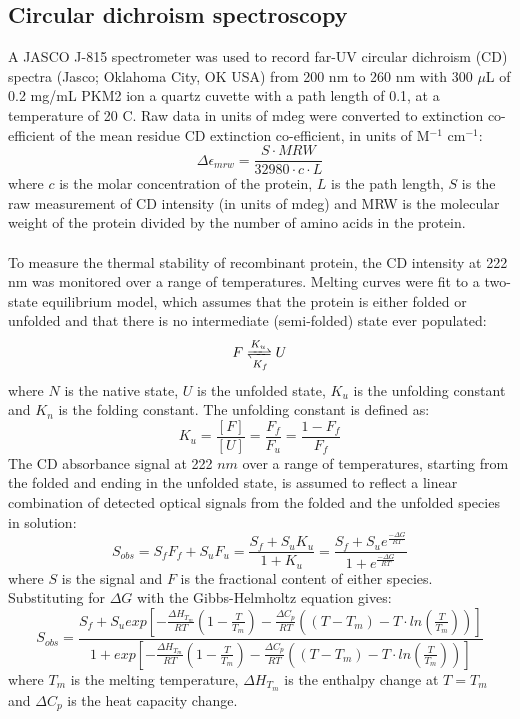 \subsection{Circular dichroism spectroscopy}
\label{methods:cd_spec}
A JASCO J-815 spectrometer was used to record far-UV circular dichroism (CD) spectra (Jasco; Oklahoma City, OK USA) from 200 nm to 260 nm with 300 $\mu$L of 0.2 mg/mL PKM2 ion a quartz cuvette with a path length of 0.1, at a temperature of 20 \textdegree C. Raw data in units of mdeg were converted to extinction co-efficient of the mean residue CD extinction co-efficient, in units of M$^{-1}$ cm$^{-1}$:
%
%
\begin{equation}
\Delta \epsilon_{mrw} = \frac{S \cdot MRW}{32980 \cdot c \cdot L}
\end{equation}
%
%
where $c$ is the molar concentration of the protein, $L$ is the path length, $S$ is the raw measurement of CD intensity (in units of mdeg) and MRW is the molecular weight of the protein divided by the number of amino acids in the protein.
%
%
\\\\
%
%
To measure the thermal stability of recombinant protein, the CD intensity at 222 nm was monitored over a range of temperatures. Melting curves were fit to a two-state equilibrium model, which assumes that the protein is either folded or unfolded and that there is no intermediate (semi-folded) state ever populated:
%
%
\begin{equation}
F \xrightleftharpoons[K_f]{K_u} U
\end{equation} 
%
%
where $N$ is the native state, $U$ is the unfolded state, $K_u$ is the unfolding constant and $K_n$ is the folding constant. The unfolding constant is defined as:
%
%
\begin{equation}
K_u = \frac{[F]}{[U]} = \frac{F_f}{F_u} =  \frac{1 - F_f}{F_f}
\end{equation}
%
%
The CD absorbance signal at 222 $nm$ over a range of temperatures, starting from the folded and ending in the unfolded state, is assumed to reflect a linear combination of detected optical signals from the folded and the unfolded species in solution:
%
%
\begin{equation}
S_{obs} = S_f F_f + S_u F_u = \frac{S_f + S_u K_u}{1 + K_u} = \frac{S_f + S_u e^{\frac{- \Delta G}{RT}}}{1 + e^{\frac{- \Delta G}{RT}}}
\end{equation}
%
%
where $S$ is the signal and $F$ is the fractional content of either species. Substituting for $\Delta G$ with the Gibbs-Helmholtz equation gives:
%
%
\begin{equation}
S_{obs} = \frac{S_f + S_u exp\left[ - \frac{\Delta H_{T_m}}{RT} \left( 1- \frac{T}{T_m} \right) - \frac{\Delta C_p}{RT} \left( (T - T_m) - T \cdot ln \left( \frac{T}{T_m} \right) \right) \right] }{1+ exp\left[ - \frac{\Delta H_{T_m}}{RT} \left( 1- \frac{T}{T_m} \right) - \frac{\Delta C_p}{RT} \left( (T - T_m) - T \cdot ln \left( \frac{T}{T_m} \right) \right) \right] }
\end{equation}
%
%
where $T_m$ is the melting temperature, $\Delta H_{T_m}$ is the enthalpy change at $T = T_m$ and $\Delta C_p$ is the heat capacity change.


